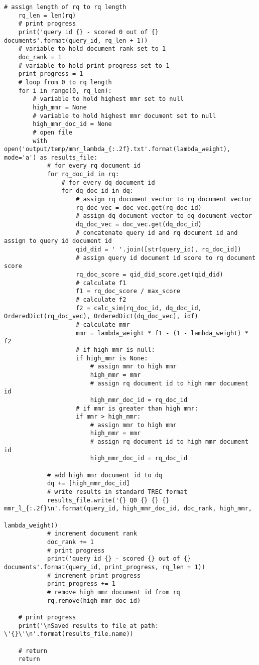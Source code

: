 \documentclass{article} %
\begin{document}
\begin{lstlisting}[style=Python]
    # assign length of rq to rq length
    rq_len = len(rq)
    # print progress
    print('query id {} - scored 0 out of {} documents'.format(query_id, rq_len + 1))
    # variable to hold document rank set to 1
    doc_rank = 1
    # variable to hold print progress set to 1
    print_progress = 1
    # loop from 0 to rq length
    for i in range(0, rq_len):
        # variable to hold highest mmr set to null
        high_mmr = None
        # variable to hold highest mmr document set to null
        high_mmr_doc_id = None
        # open file
        with open('output/temp/mmr_lambda_{:.2f}.txt'.format(lambda_weight), mode='a') as results_file:
            # for every rq document id
            for rq_doc_id in rq:
                # for every dq document id
                for dq_doc_id in dq:
                    # assign rq document vector to rq document vector
                    rq_doc_vec = doc_vec.get(rq_doc_id)
                    # assign dq document vector to dq document vector
                    dq_doc_vec = doc_vec.get(dq_doc_id)
                    # concatenate query id and rq document id and assign to query id document id
                    qid_did = ' '.join([str(query_id), rq_doc_id])
                    # assign query id document id score to rq document score
                    rq_doc_score = qid_did_score.get(qid_did)
                    # calculate f1
                    f1 = rq_doc_score / max_score
                    # calculate f2
                    f2 = calc_sim(rq_doc_id, dq_doc_id, OrderedDict(rq_doc_vec), OrderedDict(dq_doc_vec), idf)
                    # calculate mmr
                    mmr = lambda_weight * f1 - (1 - lambda_weight) * f2
                    # if high mmr is null:
                    if high_mmr is None:
                        # assign mmr to high mmr
                        high_mmr = mmr
                        # assign rq document id to high mmr document id
                        high_mmr_doc_id = rq_doc_id
                    # if mmr is greater than high mmr:
                    if mmr > high_mmr:
                        # assign mmr to high mmr
                        high_mmr = mmr
                        # assign rq document id to high mmr document id
                        high_mmr_doc_id = rq_doc_id

            # add high mmr document id to dq
            dq += [high_mmr_doc_id]
            # write results in standard TREC format
            results_file.write('{} Q0 {} {} {} mmr_l_{:.2f}\n'.format(query_id, high_mmr_doc_id, doc_rank, high_mmr,
                                                                      lambda_weight))
            # increment document rank
            doc_rank += 1
            # print progress
            print('query id {} - scored {} out of {} documents'.format(query_id, print_progress, rq_len + 1))
            # increment print progress
            print_progress += 1
            # remove high mmr document id from rq
            rq.remove(high_mmr_doc_id)

    # print progress
    print('\nSaved results to file at path: \'{}\'\n'.format(results_file.name))

    # return
    return
\end{lstlisting}
\end{document}
